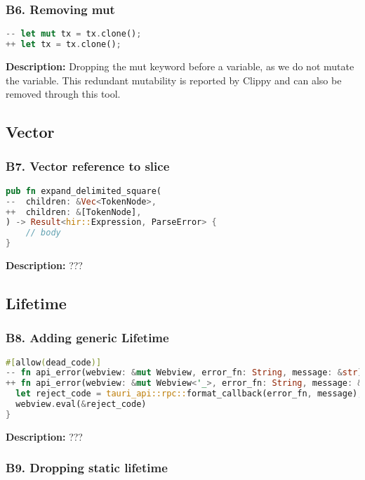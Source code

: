 \subsubsection{B6. Removing mut}

\begin{lstlisting}[language=Rust, style=colouredRust, label={l3}]
-- let mut tx = tx.clone();
++ let tx = tx.clone();
\end{lstlisting}

\noindent \textbf{Description:} Dropping the mut keyword before a variable, as we do not mutate the variable. This redundant mutability is reported by Clippy and can also be removed through this tool.

\subsection{Vector}
\subsubsection{B7. Vector reference to slice}

\begin{lstlisting}[language=Rust, style=colouredRust, label={l3}]
pub fn expand_delimited_square(
--  children: &Vec<TokenNode>,
++  children: &[TokenNode],
) -> Result<hir::Expression, ParseError> {
    // body
}
\end{lstlisting}

\noindent \textbf{Description:} ???

\subsection{Lifetime}
\subsubsection{B8. Adding generic Lifetime}
\begin{lstlisting}[language=Rust, style=colouredRust, label={l3}]
#[allow(dead_code)]
-- fn api_error(webview: &mut Webview, error_fn: String, message: &str) {
++ fn api_error(webview: &mut Webview<'_>, error_fn: String, message: &str) {
  let reject_code = tauri_api::rpc::format_callback(error_fn, message);
  webview.eval(&reject_code)
}

\end{lstlisting}

\noindent \textbf{Description:} ???

\subsubsection{B9. Dropping static lifetime}

